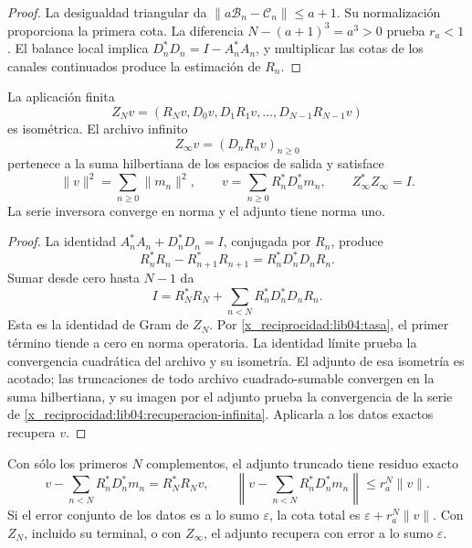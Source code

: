 \begin{proof}
La desigualdad triangular da
\(\|a\mathcal B_n-\mathcal C_n\|\leq a+1\). Su normalización
proporciona la primera cota. La diferencia
\(N-(a+1)^3=a^3>0\) prueba \(r_a<1\). El balance local implica
\(D_n^*D_n=I-A_n^*A_n\), y multiplicar las cotas de los canales
continuados produce la estimación de \(R_n\).
\end{proof}

\begin{theorem}
\label{x_reciprocidad:lib04:teo-archivo}
La aplicación finita
\begin{equation}
 Z_Nv=(R_Nv,D_0v,D_1R_1v,\ldots,D_{N-1}R_{N-1}v)
 \label{x_reciprocidad:lib04:zn}
\end{equation}
es isométrica. El archivo infinito
\begin{equation}
 Z_\infty v=(D_nR_nv)_{n\geq0}
 \label{x_reciprocidad:lib04:zinfty}
\end{equation}
pertenece a la suma hilbertiana de los espacios de salida y satisface
\begin{equation}
 \|v\|^2=\sum_{n\geq0}\|m_n\|^2,\qquad
 v=\sum_{n\geq0}R_n^*D_n^*m_n,
 \qquad Z_\infty^*Z_\infty=I.
 \label{x_reciprocidad:lib04:recuperacion-infinita}
\end{equation}
La serie inversora converge en norma y el adjunto tiene norma uno.
\end{theorem}

\begin{proof}
La identidad \(A_n^*A_n+D_n^*D_n=I\), conjugada por \(R_n\),
produce
\[
 R_n^*R_n-R_{n+1}^*R_{n+1}=R_n^*D_n^*D_nR_n.
\]
Sumar desde cero hasta \(N-1\) da
\begin{equation}
 I=R_N^*R_N+\sum_{n<N}R_n^*D_n^*D_nR_n.
 \label{x_reciprocidad:lib04:telescopia}
\end{equation}
Esta es la identidad de Gram de \(Z_N\). Por
\eqref{x_reciprocidad:lib04:tasa}, el primer término tiende a cero en norma
operatoria. La identidad límite prueba la convergencia cuadrática del
archivo y su isometría. El adjunto de esa isometría es acotado; las
truncaciones de todo archivo cuadrado-sumable convergen en la suma
hilbertiana, y su imagen por el adjunto prueba la convergencia de la
serie de \eqref{x_reciprocidad:lib04:recuperacion-infinita}. Aplicarla a los datos
exactos recupera \(v\).
\end{proof}

Con sólo los primeros \(N\) complementos, el adjunto truncado tiene
residuo exacto
\begin{equation}
 v-\sum_{n<N}R_n^*D_n^*m_n=R_N^*R_Nv,
 \qquad
 \left\|v-\sum_{n<N}R_n^*D_n^*m_n\right\|
 \leq r_a^N\|v\|.
 \label{x_reciprocidad:lib04:sesgo-truncado}
\end{equation}
Si el error conjunto de los datos es a lo sumo \(\varepsilon\), la
cota total es \(\varepsilon+r_a^N\|v\|\). Con \(Z_N\), incluido
su terminal, o con \(Z_\infty\), el adjunto recupera con error a lo
sumo \(\varepsilon\).

